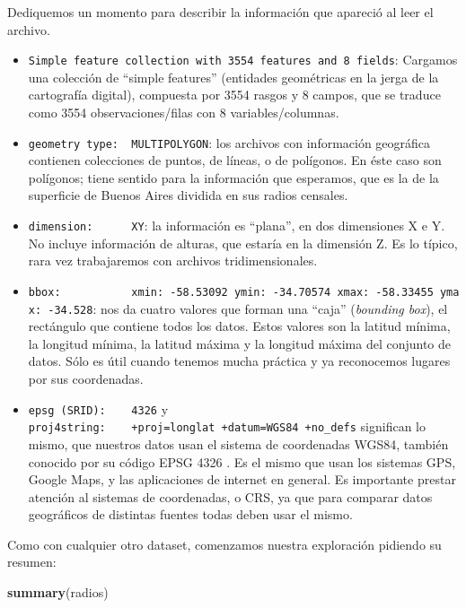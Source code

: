 \documentclass[spanish,]{book}
\newenvironment{Shaded}{\begin{snugshade}}{\end{snugshade}}
\newcommand{\KeywordTok}[1]{\textcolor[rgb]{0.13,0.29,0.53}{\textbf{#1}}}
\newcommand{\NormalTok}[1]{#1}
\providecommand{\tightlist}{%
  \setlength{\itemsep}{0pt}\setlength{\parskip}{0pt}}
\begin{document}
Dediquemos un momento para describir la información que apareció al leer el archivo.

\begin{itemize}
\tightlist
\item
  \texttt{Simple\ feature\ collection\ with\ 3554\ features\ and\ 8\ fields}: Cargamos una colección de ``simple features'' (entidades geométricas en la jerga de la cartografía digital), compuesta por 3554 rasgos y 8 campos, que se traduce como 3554 observaciones/filas con 8 variables/columnas.
\item
  \texttt{geometry\ type:\ \ MULTIPOLYGON}: los archivos con información geográfica contienen colecciones de puntos, de líneas, o de polígonos. En éste caso son polígonos; tiene sentido para la información que esperamos, que es la de la superficie de Buenos Aires dividida en sus radios censales.
\item
  \texttt{dimension:\ \ \ \ \ \ XY}: la información es ``plana'', en dos dimensiones X e Y. No incluye información de alturas, que estaría en la dimensión Z. Es lo típico, rara vez trabajaremos con archivos tridimensionales.
\item
  \texttt{bbox:\ \ \ \ \ \ \ \ \ \ \ xmin:\ -58.53092\ ymin:\ -34.70574\ xmax:\ -58.33455\ ymax:\ -34.528}: nos da cuatro valores que forman una ``caja'' (\emph{bounding box}), el rectángulo que contiene todos los datos. Estos valores son la latitud mínima, la longitud mínima, la latitud máxima y la longitud máxima del conjunto de datos. Sólo es útil cuando tenemos mucha práctica y ya reconocemos lugares por sus coordenadas.
\item
  \texttt{epsg\ (SRID):\ \ \ \ 4326} y \texttt{proj4string:\ \ \ \ +proj=longlat\ +datum=WGS84\ +no\_defs} significan lo mismo, que nuestros datos usan el sistema de coordenadas WGS84, también conocido por su código EPSG 4326 . Es el mismo que usan los sistemas GPS, Google Maps, y las aplicaciones de internet en general. Es importante prestar atención al sistemas de coordenadas, o CRS, ya que para comparar datos geográficos de distintas fuentes todas deben usar el mismo.
\end{itemize}

Como con cualquier otro dataset, comenzamos nuestra exploración pidiendo su resumen:

\begin{Shaded}
\begin{Highlighting}[]
\KeywordTok{summary}\NormalTok{(radios)}
\end{Highlighting}
\end{Shaded}
\end{document}
